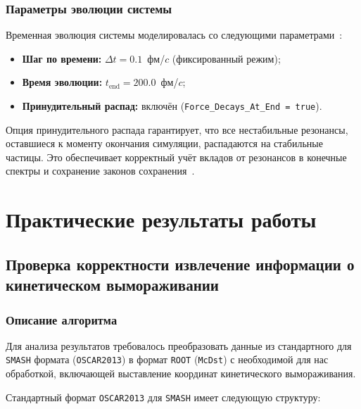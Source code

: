 \documentclass[a4paper]{extarticle}
\begin{document}
        \subsubsection{Параметры эволюции системы}
            Временная эволюция системы моделировалась 
            со следующими параметрами~\cite{Weil:2016zrk}:
            \begin{itemize}
                \item \textbf{Шаг по времени:} 
                    $\Delta t = 0.1$~фм/$c$ (фиксированный режим);
                \item \textbf{Время эволюции:} 
                    $t_{\text{end}} = 200.0$~фм/$c$;
                \item \textbf{Принудительный распад:} 
                    включён (\texttt{Force\_Decays\_At\_End = true}).
            \end{itemize}

            Опция принудительного распада гарантирует, что все нестабильные резонансы, 
            оставшиеся к моменту окончания симуляции, распадаются на стабильные частицы. 
            Это обеспечивает корректный учёт вкладов от резонансов 
            в конечные спектры и сохранение законов сохранения~\cite{Weil:2016zrk}.

\section{Практические результаты работы}
    \subsection{Проверка корректности извлечение информации о кинетическом вымораживании}

        \subsubsection{Описание алгоритма}
            Для анализа результатов требовалось преобразовать данные 
            из стандартного для \texttt{SMASH} формата (\texttt{OSCAR2013}) 
            в формат \texttt{ROOT} (\texttt{McDst}) с необходимой для нас обработкой, 
            включающей выставление координат кинетического вымораживания.

            Стандартный формат \texttt{OSCAR2013} для \texttt{SMASH} имеет следующую структуру:
\end{document}
